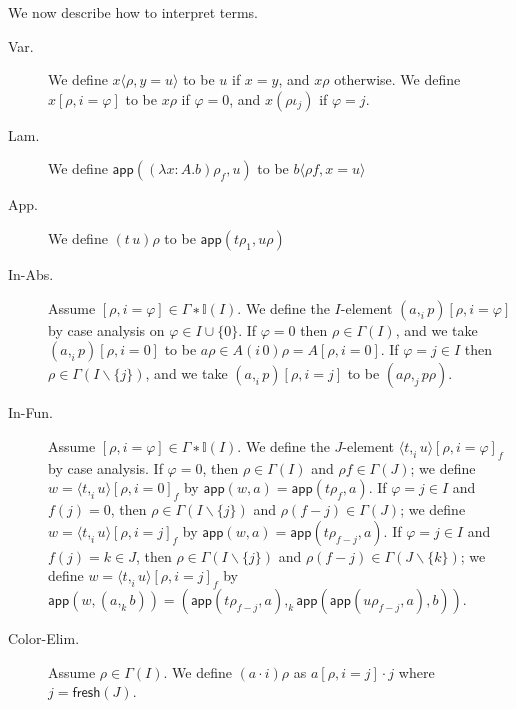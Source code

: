 \documentclass[english]{PaperTools/latex/entcs}
\theoremstyle{plain}
\theoremstyle{definition}
\theoremstyle{remark}
\newcommand\param[1]{\!\cdot\!#1}
\newcommand\fp[3]{⟨#2 ,_{#1} #3⟩}
\def\fresh#1{\mathsf{fresh}(#1)}
\def\app#1#2{\mathsf{app}(#1,#2)}
\begin{document}
\bigskip
We now describe how to interpret terms.
\begin{description}
  \item[\sc Var.]
    We define $x⟨ρ,y=u⟩$ to be $u$ if $x = y$, and $xρ$ otherwise.
    We define $x[ρ,i=φ]$ to be $xρ$ if $φ = 0$, and
    $x(ρι_j)$ if $φ = j$.

  \item[\sc Lam.]
    We define $\app{(λ x:A.b)ρ_f}{u}$ to be $b⟨ρf,x=u⟩$

  \item[\sc App.]
    We define $(t\,u)ρ$ to be $\app{tρ_1}{uρ}$

  \item[\sc In-Abs.]
    Assume $[ρ,i=φ] ∈ Γ∗𝕀(I)$.  We define the $I$-element $(a ,_i p)[ρ,i=φ]$
    by case analysis on $φ ∈ I ∪ \{0\}$.
    If $φ = 0$ then $ρ ∈ Γ(I)$, and we take $(a ,_i p)[ρ,i=0]$ to be
    $aρ ∈ A(i\,0)ρ = A[ρ,i=0]$.
    If $φ = j ∈ I$ then $ρ ∈ Γ(I\backslash\{j\})$, and we take
    $(a ,_i p)[ρ,i=j]$ to be $(aρ ,_j pρ)$.

  \item[\sc In-Fun.]
    Assume $[ρ,i=φ] ∈ Γ∗𝕀(I)$.  We define the $J$-element ${\fp i t u}[ρ,i=φ]_f$
    by case analysis.
    If $φ = 0$, then $ρ ∈ Γ(I)$ and $ρf ∈ Γ(J)$; we define
    $w = {\fp i t u}[ρ,i=0]_f$ by $\app{w}{a} = \app{tρ_f}{a}$.
    If $φ = j ∈ I$ and $f(j) = 0$, then $ρ ∈ Γ(I\backslash\{j\})$ and $ρ(f-j) ∈ Γ(J)$;
    we define $w = {\fp i t u}[ρ,i=j]_f$ by $\app{w}{a} = \app{tρ_{f-j}}{a}$.
    If $φ = j ∈ I$ and $f(j) = k ∈ J$, then $ρ ∈ Γ(I\backslash\{j\})$ and $ρ(f-j) ∈ Γ(J\backslash\{k\})$;
    we define $w = {\fp i t u}[ρ,i=j]_f$ by
    $\app{w}{(a ,_k b)} = ( \app{tρ_{f-j}}{a} ,_k {\app{\app{uρ_{f-j}}{a}}{b}} )$.

  \item[\sc Color-Elim.]
    Assume $ρ ∈ Γ(I)$.  We define $(a \param i)ρ$ as
    $a[ρ,i=j]·j$ where $j = \fresh{J}$.
\end{description}
\end{document}
